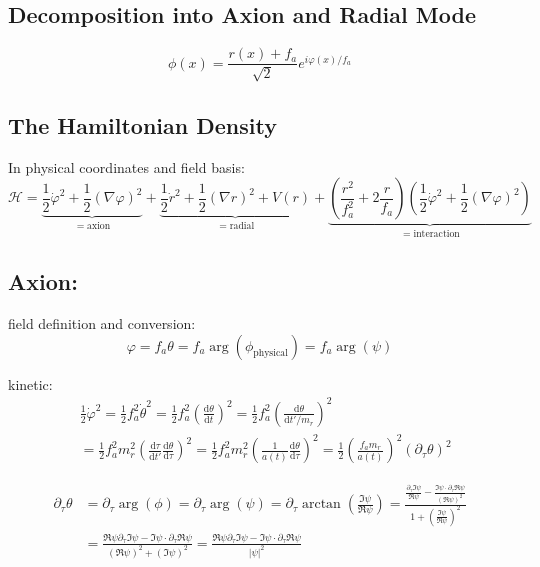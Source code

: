 \documentclass[a4paper]{article}
\begin{document}
\subsection{Decomposition into Axion and Radial Mode}
\begin{equation}
    \phi(x) = \frac{r(x) + f_a}{\sqrt{2}} e^{i \varphi(x) / f_a }
\end{equation}

\subsection{The Hamiltonian Density}
In physical coordinates and field basis:
\begin{equation}
    \mathcal{H} =
    \underbrace{\frac{1}{2} \dot{\varphi}^2 + \frac{1}{2} (\nabla \varphi)^2}_{= \mathrm{axion}} +
    \underbrace{\frac{1}{2} \dot{r}^2 + \frac{1}{2} (\nabla r)^2 + V(r)}_{= \mathrm{radial}} +
    \underbrace{\left( \frac{r^2}{f_a^2} + 2 \frac{r}{f_a} \right) \left( \frac{1}{2} \dot{\varphi}^2 + \frac{1}{2} (\nabla \varphi)^2 \right)}_{= \mathrm{interaction}}
\end{equation}

\subsection{Axion:}

field definition and conversion:
\begin{equation}
    \varphi = f_a \theta = f_a \arg(\phi_\mathrm{physical}) = f_a \arg(\psi)
\end{equation}

kinetic:
\begin{align}
    &\frac{1}{2} \dot{\varphi}^2 = \frac{1}{2} f_a^2 \dot{\theta}^2
    = \frac{1}{2} f_a^2 \left( \frac{\mathrm{d} \theta}{\mathrm{d} t} \right)^2
    = \frac{1}{2} f_a^2 \left( \frac{\mathrm{d} \theta}{\mathrm{d} t' / m_r} \right)^2 \\
    &= \frac{1}{2} f_a^2 m_r^2 \left( \frac{\mathrm{d} \tau}{\mathrm{d} t'} \frac{\mathrm{d} \theta}{\mathrm{d} \tau} \right)^2
    = \frac{1}{2} f_a^2 m_r^2 \left( \frac{1}{a(t)} \frac{\mathrm{d} \theta}{\mathrm{d} \tau} \right)^2
    = \frac{1}{2} \left( \frac{f_a m_r}{a(t)} \right)^2 \left( \partial_\tau \theta \right)^2
\end{align}

\begin{align}
    \partial_\tau \theta &= \partial_\tau \arg(\phi) = \partial_\tau \arg(\psi) = \partial_\tau \arctan \left( \frac{ \Im \psi }{ \Re \psi } \right)
    = \frac{ \frac{ \partial_\tau \Im \psi }{ \Re \psi } - \frac{ \Im \psi \cdot \partial_\tau \Re \psi}{(\Re \psi)^2}}{ 1 + \left( \frac{\Im \psi}{\Re \psi} \right)^2} \\
                         &= \frac{ \Re \psi \partial_\tau \Im \psi - \Im \psi \cdot \partial_\tau \Re \psi}{ (\Re \psi)^2 + (\Im \psi)^2} =  \frac{ \Re \psi \partial_\tau \Im \psi - \Im \psi \cdot \partial_\tau \Re \psi}{|\psi|^2}
\end{align}
\end{document}
